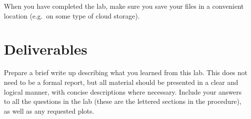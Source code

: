 \begin{enumerate}
\begin{enumerate}
          \end{enumerate}
\end{enumerate}

When you have completed the lab, make sure you save your files in a convenient location (e.g.\ on some type of cloud storage).

\section{Deliverables}
Prepare a brief write up describing what you learned from this lab. This does not need to be a formal report, but all material should be presented in a clear and logical manner, with concise descriptions where necessary. Include your answers to all the questions in the lab (these are the lettered sections in the procedure), as well as any requested plots.